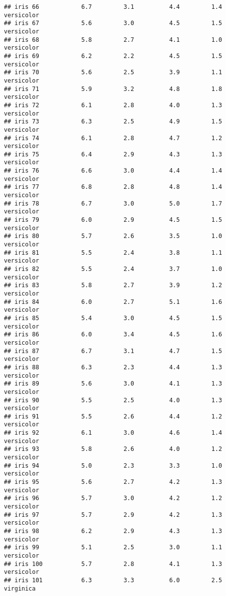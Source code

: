 \documentclass[
]{article}
\begin{document}
\begin{verbatim}
## iris 66            6.7         3.1          4.4         1.4 versicolor
## iris 67            5.6         3.0          4.5         1.5 versicolor
## iris 68            5.8         2.7          4.1         1.0 versicolor
## iris 69            6.2         2.2          4.5         1.5 versicolor
## iris 70            5.6         2.5          3.9         1.1 versicolor
## iris 71            5.9         3.2          4.8         1.8 versicolor
## iris 72            6.1         2.8          4.0         1.3 versicolor
## iris 73            6.3         2.5          4.9         1.5 versicolor
## iris 74            6.1         2.8          4.7         1.2 versicolor
## iris 75            6.4         2.9          4.3         1.3 versicolor
## iris 76            6.6         3.0          4.4         1.4 versicolor
## iris 77            6.8         2.8          4.8         1.4 versicolor
## iris 78            6.7         3.0          5.0         1.7 versicolor
## iris 79            6.0         2.9          4.5         1.5 versicolor
## iris 80            5.7         2.6          3.5         1.0 versicolor
## iris 81            5.5         2.4          3.8         1.1 versicolor
## iris 82            5.5         2.4          3.7         1.0 versicolor
## iris 83            5.8         2.7          3.9         1.2 versicolor
## iris 84            6.0         2.7          5.1         1.6 versicolor
## iris 85            5.4         3.0          4.5         1.5 versicolor
## iris 86            6.0         3.4          4.5         1.6 versicolor
## iris 87            6.7         3.1          4.7         1.5 versicolor
## iris 88            6.3         2.3          4.4         1.3 versicolor
## iris 89            5.6         3.0          4.1         1.3 versicolor
## iris 90            5.5         2.5          4.0         1.3 versicolor
## iris 91            5.5         2.6          4.4         1.2 versicolor
## iris 92            6.1         3.0          4.6         1.4 versicolor
## iris 93            5.8         2.6          4.0         1.2 versicolor
## iris 94            5.0         2.3          3.3         1.0 versicolor
## iris 95            5.6         2.7          4.2         1.3 versicolor
## iris 96            5.7         3.0          4.2         1.2 versicolor
## iris 97            5.7         2.9          4.2         1.3 versicolor
## iris 98            6.2         2.9          4.3         1.3 versicolor
## iris 99            5.1         2.5          3.0         1.1 versicolor
## iris 100           5.7         2.8          4.1         1.3 versicolor
## iris 101           6.3         3.3          6.0         2.5  virginica

\end{verbatim}
\end{document}
